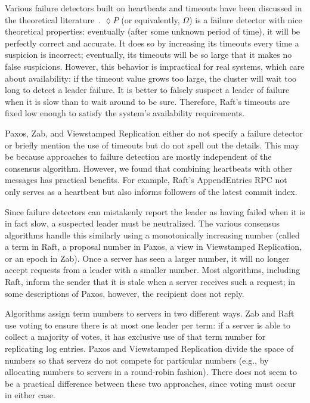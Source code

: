 Various failure detectors built on heartbeats and timeouts have been
discussed in the theoretical literature~\cite{Chandra:1996}. $\lozenge
P$ (or equivalently, $\Omega$) is a failure detector with nice
theoretical properties: eventually (after some unknown period of time),
it will be perfectly correct and accurate. It does so by increasing its
timeouts every time a suspicion is incorrect; eventually, its timeouts
will be so large that it makes no false suspicions.
However, this behavior is
impractical for real systems, which care about availability:
if the timeout value grows too large, the
cluster will wait too long to detect a leader failure. It is better to
falsely suspect a leader of failure when it is slow than to wait around
to be sure. Therefore, Raft's timeouts are fixed low enough to
satisfy the system's availability requirements.

Paxos, Zab, and Viewstamped Replication either do not specify a failure
detector or briefly mention the use of timeouts but do not spell out the
details. This may be because approaches to failure detection are mostly
independent of the consensus algorithm. However, we found that combining
heartbeats with other messages has practical benefits. For example,
Raft's AppendEntries RPC not only serves as a heartbeat but also informs
followers of the latest commit index.

Since failure detectors can mistakenly report the leader as having
failed when it is in fact slow, a suspected leader must be neutralized.
The various consensus algorithms handle this similarly using a
monotonically increasing number (called a term in Raft, a proposal
number in Paxos, a view in Viewstamped Replication, or an epoch in Zab).
Once a server has seen a larger number, it will no longer accept
requests from a leader with a smaller number. Most algorithms, including
Raft, inform the sender that it is stale when a server receives such
a request; in some descriptions of Paxos, however, the recipient does
not reply.

Algorithms assign term numbers to servers in two different ways. Zab and
Raft use voting to ensure there is at most one leader per term: if a
server is able to collect a majority of votes, it has exclusive use of
that term number for replicating log entries. Paxos and Viewstamped
Replication divide the space of numbers so that servers do not compete
for particular numbers (e.g., by allocating numbers to servers in a
round-robin fashion). There does not seem to be a practical difference
between these two approaches, since voting must occur in either case.


